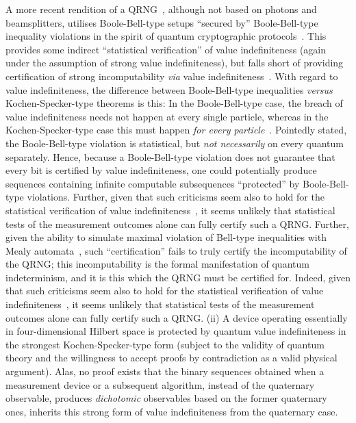 \documentclass{mscs}
\begin{document}
A more recent rendition of a QRNG~\citep{10.1038/nature09008}, although not based on photons and beamsplitters, utilises Boole-Bell-type setups ``secured by''
Boole-Bell-type inequality violations
in the spirit of quantum cryptographic protocols~\citep{ekert91,PhysRevLett.85.3313}.
This provides some indirect ``statistical verification'' of value indefiniteness (again under the assumption of strong value indefiniteness),
but falls short of providing certification of strong incomputability
{\it via} value indefiniteness~\citep{2008-cal-svo,svozil-2009-howto}.
With regard to value indefiniteness,
the difference between Boole-Bell-type inequalities  {\it versus} Kochen-Specker-type theorems is this:
In the Boole-Bell-type case,
the breach of value indefiniteness needs not happen at every single particle,
whereas in the Kochen-Specker-type case this must happen {\em for every particle}~\citep{svozil_2010-pc09}.
Pointedly stated, the Boole-Bell-type violation is statistical, but {\em not necessarily} on every quantum separately.
Hence, because a Boole-Bell-type violation does not guarantee that every bit is certified by value indefiniteness,
one could potentially produce sequences containing infinite computable subsequences
``protected'' by Boole-Bell-type violations.
Further,   given that such criticisms seem also to hold for the statistical verification of value indefiniteness~\citep{panbdwz,huang-2003,cabello:210401}, it seems unlikely that statistical tests of the measurement outcomes alone can fully certify such a QRNG.
Further, given the ability to simulate maximal violation of Bell-type inequalities with Mealy automata~\citep{Cabello:PC2010}, such ``certification'' fails to truly certify the incomputability of the QRNG; this incomputability is the formal manifestation of quantum indeterminism, and it is this which the QRNG must be certified for. Indeed, given that such criticisms seem also to hold for the statistical verification of value indefiniteness~\citep{panbdwz,huang-2003,cabello:210401}, it seems unlikely that statistical tests of the measurement outcomes alone can fully certify such a QRNG.
\fi
{}
(ii)   
A device operating essentially in four-dimensional Hilbert space is protected by quantum value indefiniteness in the
strongest Kochen-Specker-type form
(subject to the validity of quantum theory and the willingness to accept proofs by contradiction
as a valid physical argument).
Alas, no proof exists that the binary sequences obtained when a measurement device or a subsequent algorithm,
instead of the quaternary observable,
produces {\em dichotomic} observables based on the former quaternary
ones,
inherits this strong form of value indefiniteness from the quaternary case.
\fi
\end{document}
